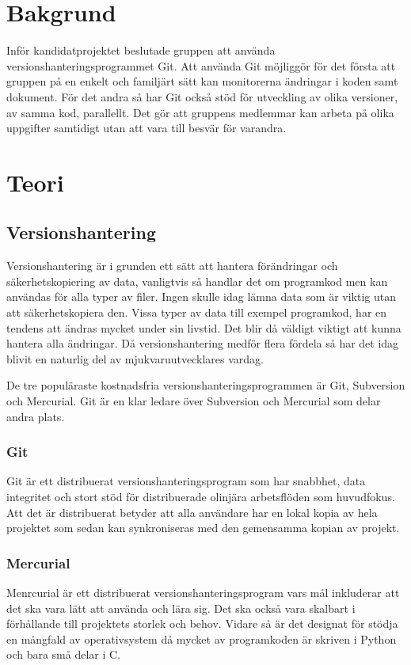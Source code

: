 \section{Bakgrund}
Inför kandidatprojektet beslutade gruppen att använda versionshanteringsprogrammet Git. Att använda Git möjliggör för det första att gruppen på en enkelt och familjärt sätt kan monitorerna ändringar i koden samt dokument. För det andra så har Git också stöd för utveckling av olika versioner, av samma kod, parallellt. Det gör att gruppens medlemmar kan arbeta på olika uppgifter samtidigt utan att vara till besvär för varandra.


\section{Teori}
\subsection{Versionshantering}
Versionshantering är i grunden ett sätt att hantera förändringar och säkerhetskopiering av data, vanligtvis så handlar det om programkod men kan användas för alla typer av filer. Ingen skulle idag lämna data som är viktig utan att säkerhetskopiera den. Vissa typer av data till exempel programkod, har en tendens att ändras mycket under sin livstid. Det blir då väldigt viktigt att kunna hantera alla ändringar. Då versionshantering medför flera fördela så har det idag blivit en naturlig del av mjukvaruutvecklares vardag.\cite{VersionControlGit}

De tre populäraste kostnadsfria versionshanteringsprogrammen är Git, Subversion och Mercurial. Git är en klar ledare över Subversion och Mercurial som delar andra plats.\cite{version_comp}
\subsubsection{Git}
Git är ett distribuerat versionshanteringsprogram som har snabbhet, data integritet och stort stöd för distribuerade olinjära arbetsflöden som huvudfokus. Att det är distribuerat betyder att alla användare har en lokal kopia av hela projektet som sedan kan synkroniseras med den gemensamma kopian av projekt.\cite{VersionControlGit}\cite{web_Git}

\subsubsection{Mercurial}
Menrcurial är ett distribuerat versionshanteringsprogram vars mål inkluderar att det ska vara lätt att använda och lära sig. Det ska också vara skalbart i förhållande till projektets storlek och behov. Vidare så är det designat för stödja en mångfald av operativsystem då mycket av programkoden är skriven i Python och bara små delar i C.
\cite{VersionControlMercurial}\cite{VersionControlMercurial}


